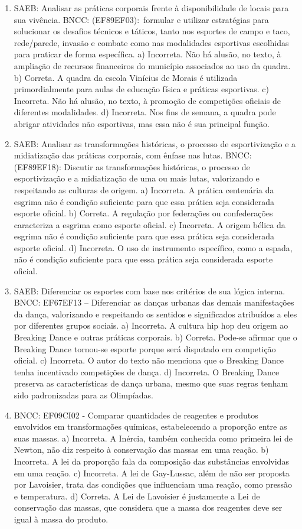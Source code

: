 \begin{enumerate}
\item
SAEB: Analisar as práticas corporais frente à disponibilidade de locais
para sua vivência.
BNCC: (EF89EF03):~formular e utilizar estratégias para solucionar os
desafios técnicos e táticos, tanto nos esportes de campo e taco,
rede/parede, invasão e combate como nas modalidades esportivas
escolhidas para praticar de forma específica.
a) Incorreta. Não há alusão, no texto, à ampliação de recursos financeiros do município associados ao uso da quadra. 
b) Correta. A quadra da escola Vinícius de Morais é utilizada 
primordialmente para aulas de educação física e práticas esportivas.  
c) Incorreta. Não há alusão, no texto, à promoção de competições oficiais de diferentes modalidades.
d) Incorreta. Nos fins de semana, a quadra pode abrigar atividades não esportivas, mas essa não é sua principal função.

\item
SAEB: Analisar as transformações históricas, o processo de
esportivização e a midiatização das práticas corporais, com ênfase nas
lutas.
BNCC: (EF89EF18): Discutir as transformações históricas, o processo de
esportivização e a midiatização de uma ou mais lutas, valorizando e
respeitando as culturas de origem.
a) Incorreta. A prática centenária da esgrima não é condição suficiente 
para que essa prática seja considerada esporte oficial.
b) Correta. A regulação por federações ou confederações caracteriza a 
esgrima como esporte oficial. 
c) Incorreta. A origem bélica da esgrima não é condição suficiente 
para que essa prática seja considerada esporte oficial. 
d) Incorreta. O uso de instrumento específico, como a espada, não é
condição suficiente  para que essa prática seja considerada esporte 
oficial.

\item
SAEB: Diferenciar os esportes com base nos critérios de sua lógica
interna.
BNCC: EF67EF13 -- Diferenciar as danças urbanas das demais manifestações
da dança, valorizando e respeitando os sentidos e significados
atribuídos a eles por diferentes grupos sociais.
a) Incorreta. A cultura hip hop deu origem ao Breaking Dance e outras
práticas corporais.
b) Correta. Pode-se afirmar que o Breaking Dance tornou-se esporte
porque será disputado em competição oficial. 
c) Incorreta. O autor do texto não menciona que o Breaking Dance tenha
incentivado competições de dança.
d) Incorreta. O Breaking Dance preserva as características de dança
urbana, mesmo que suas regras tenham sido padronizadas para as Olimpíadas.

\item
BNCC: EF09CI02 - Comparar quantidades de reagentes e
produtos envolvidos em transformações químicas, estabelecendo a
proporção entre as suas massas.
a)  Incorreta. A Inércia, também conhecida como primeira lei de Newton,
  não diz respeito à conservação das massas em uma reação.
b)  Incorreta. A lei da proporção fala da composição das substâncias envolvidas em uma reação.
c)  Incorreta. A lei de Gay-Lussac, além de não ser proposta por Lavoisier, trata das condições que influenciam uma reação, como pressão e temperatura.
d)  Correta. A Lei de Lavoisier é justamente a Lei de conservação das
  massas, que considera que a massa dos reagentes deve ser igual à massa do produto.


\end{enumerate}
